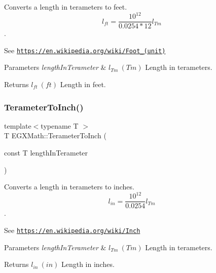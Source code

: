 Converts a length in terameters to feet. \[ l_{ft}= \frac{10^{12}}{0.0254 * 12} l_{Tm} \]. 

See \href{https://en.wikipedia.org/wiki/Foot_(unit)}{\tt https\+://en.\+wikipedia.\+org/wiki/\+Foot\+\_\+(unit)} 
\begin{DoxyParams}{Parameters}
{\em length\+In\+Terameter} & $ l_{Tm}\ (Tm)$ Length in terameters. \\
\hline
\end{DoxyParams}
\begin{DoxyReturn}{Returns}
$ l_{ft}\ (ft)$ Length in feet. 
\end{DoxyReturn}
\mbox{\label{group___e_g_x_math-_conversions-_length_conversions-_terameter-_imperial_ga85c9ddc82ba02c1fea0b22b896fed936}} 
\subsubsection{\texorpdfstring{Terameter\+To\+Inch()}{TerameterToInch()}}
{\footnotesize\ttfamily template$<$typename T $>$ \\
T E\+G\+X\+Math\+::\+Terameter\+To\+Inch (\begin{DoxyParamCaption}\item[{const T}]{length\+In\+Terameter }\end{DoxyParamCaption})}



Converts a length in terameters to inches. \[ l_{in}= \frac{10^{12}}{0.0254} l_{Tm} \]. 

See \href{https://en.wikipedia.org/wiki/Inch}{\tt https\+://en.\+wikipedia.\+org/wiki/\+Inch} 
\begin{DoxyParams}{Parameters}
{\em length\+In\+Terameter} & $ l_{Tm}\ (Tm)$ Length in terameters. \\
\hline
\end{DoxyParams}
\begin{DoxyReturn}{Returns}
$ l_{in}\ (in)$ Length in inches. 
\end{DoxyReturn}
\mbox{\label{group___e_g_x_math-_conversions-_length_conversions-_terameter-_imperial_ga9ae6fa58a9800d91e89f76e68838fa86}} 
